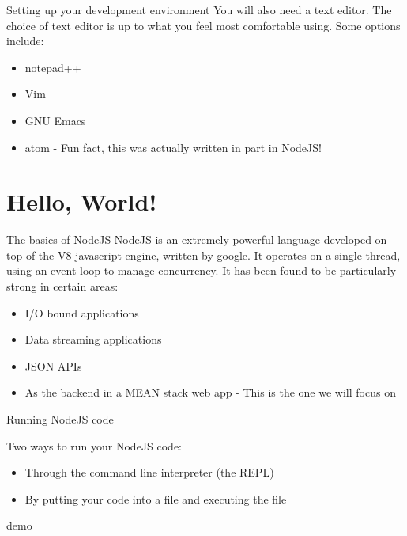 \documentclass{beamer}
\begin{document}
\begin{frame}{Setting up your development environment}
You will also need a text editor. The choice of text editor is up to what you feel most comfortable using.
\pause
Some options include:
\begin{itemize}
  \pause
  \item notepad++
  \pause
  \item Vim
  \pause
  \item GNU Emacs
  \pause
  \item atom \pause - Fun fact, this was actually written in part in NodeJS!
\end{itemize}
\end{frame}

\section*{Hello, World!}

\begin{frame}{The basics of NodeJS}
NodeJS is an extremely powerful language developed on top of the V8 javascript engine, written by google.
\pause
It operates on a single thread, using an event loop to manage concurrency.
\pause
It has been found to be particularly strong in certain areas:
\pause
\begin{itemize}
  \item I/O bound applications \pause
  \item Data streaming applications\pause
  \item JSON APIs\pause
  \item As the backend in a MEAN stack web app \pause - This is the one we will focus on
\end{itemize}
\end{frame}

\begin{frame}{Running NodeJS code}

Two ways to run your NodeJS code:

\begin{itemize}
  \item Through the command line interpreter (the REPL)
  \item By putting your code into a file and executing the file
\end{itemize}

\pause
demo

\end{frame}
\end{document}
